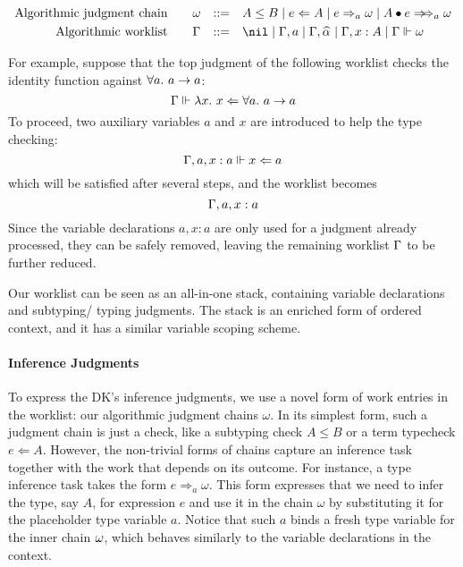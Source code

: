 
$$\begin{aligned}
\text{Algorithmic judgment chain}\qquad&\jg &::=&\quad A \le B \mid e\Lto A \mid e\To_{a} \jg \mid \appInfAlg{A}{e}\\
\text{Algorithmic worklist}\qquad&\Gm &::=&\quad \nil \mid \Gm, a \mid \Gm, \al \mid \Gm, x: A \mid \Gm \Vdash \jg\\
\end{aligned}$$

For example, suppose that the top judgment of the following worklist
checks the identity function against $\all a \to a$:
$$\Gm \Vdash \lam x \Lto \all a \to a$$
To proceed, two auxiliary variables $a$ and $x$ are introduced to help the type checking:
$$\Gamma, a, x:a \Vdash x \Leftarrow a$$
which will be satisfied after several steps, and the worklist becomes
$$\Gamma, a, x:a$$
Since the variable declarations $a, x:a$ are only used for a judgment already processed,
they can be safely removed, leaving the remaining worklist $\Gamma$ to be further reduced.

Our worklist can be seen as an all-in-one stack,
containing variable declarations and subtyping/ typing judgments.
The stack is an enriched form of ordered context,
and it has a similar variable scoping scheme.


\paragraph{Inference Judgments}
To express the DK's inference judgments, we use a novel form of work entries in
the worklist: our algorithmic judgment chains $\omega$. In its simplest form,
such a judgment chain is just a check, like a subtyping check $A \leq B$ or a
term typecheck $e \Leftarrow A$. 
However, the non-trivial forms of chains capture an
inference task together with the work that depends on its outcome. For
instance, a type inference task takes the form $e \Rightarrow_a \omega$.
This form expresses that we need to infer the type, say $A$, for expression $e$ and use it
in the chain $\omega$ by substituting it for the placeholder type variable $a$.
Notice that such $a$ binds a fresh type variable for the inner chain $\omega$,
which behaves similarly to the variable declarations in the context.

